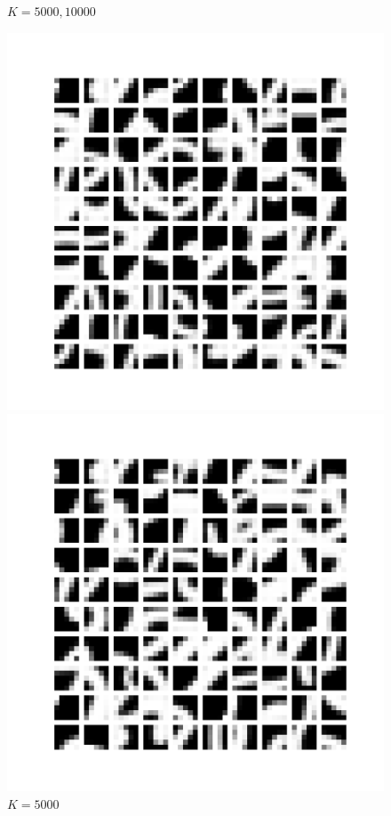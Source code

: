 \documentclass{article}
\begin{document}
\begin{itemize}
\begin{figure}[htbp!]
\begin{minipage}{0.4\textwidth}
        \caption{$K = 2000$}
        \label{fig:2000-centroids}
    \end{minipage}
\item $K = 5000, 10000$    
    \begin{minipage}{0.4\textwidth}
        \centering
        \includegraphics[width=\textwidth]{K-means/Result/Centroids/5000-clusters-centroids.png}
        \caption{$K = 5000$}
        \label{fig:5000-centroids}
    \end{minipage}%
    \begin{minipage}{0.4\textwidth}
        \centering
        \includegraphics[width=\textwidth]{K-means/Result/Centroids/10000-clusters-centroids.png}

\end{minipage}
\end{figure}
\end{itemize}
\end{document}
